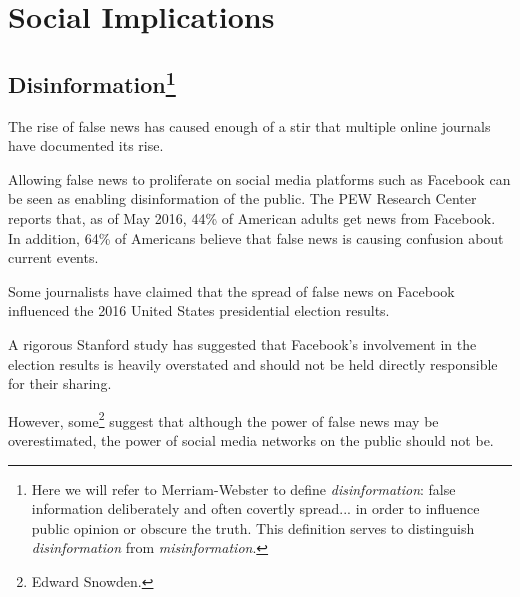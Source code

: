 
\section{Social Implications}


\subsection[Disinformation]{Disinformation\footnote{Here we will refer to Merriam-Webster to define \emph{disinformation}: false information deliberately and often covertly spread... in order to influence public opinion or obscure the truth. \cite{dictionary} This definition serves to distinguish \emph{disinformation} from \emph{misinformation}.}}

\par The rise of false news has caused enough of a stir that multiple online journals have documented its rise. \cite{tc_what_is_fake_news,telegraph_fake_news,npr_fake_news}

\par Allowing false news to proliferate on social media platforms such as Facebook can be seen as enabling disinformation of the public. \cite{tc_facebook_responsibility} The PEW Research Center reports that, as of May 2016, 44\% of American adults get news from Facebook. \cite{pew_social_media_news} In addition, 64\% of Americans believe that false news is causing confusion about current events. \cite{pew_fn_confusion}

\par Some journalists have claimed that the spread of false news on Facebook influenced the 2016 United States presidential election results. \cite{npr_fake_news}

\par A rigorous Stanford study has suggested that Facebook's involvement in the election results is heavily overstated and should not be held directly responsible for their sharing. \cite{stanford_fake_news_study}

\par However, some\footnote{Edward Snowden.} suggest that although the power of false news may be overestimated, the power of social media networks on the public should not be. \cite{tc_snowden_fb}

